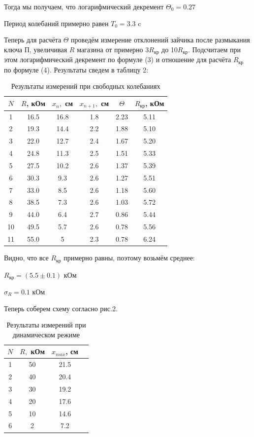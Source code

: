\documentclass[a4paper, 12pt]{article}
\begin{document}
\noindent Тогда мы получаем, что логарифмический декремент $ \Theta_0  = 0.27$

\noindent Период колебаний примерно равен $ T_0  = 3.3$ c

Теперь для расчёта $ \Theta $  проведём измерение отклонений зайчика после размыкания ключа $ П $, увеличивая $ R $ магазина от примерно $ 3R_{кр} $  до 1$ 0R_{кр} $. Подсчитаем при этом логарифмический декремент по формуле (3) и отношение для расчёта $ R_{кр} $ по формуле (4). Результаты сведем в таблицу 2:

\begin{table}[h]
	\centering
	\caption{Результаты измерений при свободных колебаниях}
	\begin{tabular}{|c|c|c|c|c|c|}
		\hline
		$ N $& $R$, кОм & $ x_n, $ см &$ x_{n+1}, $ см & $ \Theta $ & $ R_{кр} $, кОм\\
		\hline
		1 & 16.5 & 16.8 & 1.8 & 2.23 & 5.11\\
		2 & 19.3 & 14.4 & 2.2 & 1.88 & 5.10 \\
		3 & 22.0 & 12.7 & 2.4 & 1.67 & 5.20 \\
		4 & 24.8 & 11.3 & 2.5 & 1.51 & 5.33 \\
		5 & 27.5 & 10.2 & 2.6 & 1.37 & 5.39 \\
		6 & 30.3 & 9.3 & 2.6 & 1.27 & 5.51 \\
		7 & 33.0 & 8.5 & 2.6 & 1.18 & 5.60 \\
		8 & 38.5 & 7.3 & 2.6 & 1.03 & 5.72 \\
		9 & 44.0 & 6.4 & 2.7 & 0.86 & 5.44 \\
		10 & 49.5 & 5.7 & 2.6 & 0.78 & 5.56 \\
		11 & 55.0 & 5 & 2.3 & 0.78 & 6.24 \\
		\hline
	\end{tabular}%
	\label{resR}%
\end{table}%

Видно, что все $R_\text{кр}$ примерно равны, поэтому возьмём среднее:

$R_\text{кр} = (5.5 \pm 0.1)$ кОм

$\sigma_R = 0.1$ кОм


\newpage

Теперь соберем схему согласно рис.2. 

\begin{table}[h]
	\centering
	\caption{Результаты измерений при динамическом режиме}
	\begin{tabular}{|c|c|c|c|}
		\hline
	$ N $ & $ R, $ кОм & $ x_{max}$, см \\
		\hline
		1 & 50 & 21.5 \\
		2 & 40 & 20.4 \\
		3 & 30 & 19.2 \\
		4 & 20 & 17.6 \\
		5 & 10 & 14.6 \\
		6 & 2 & 7.2  \\
		\hline
	\end{tabular}%
	\label{resL}%
\end{table}%
\end{document}
